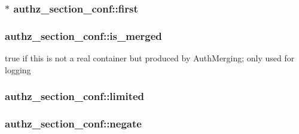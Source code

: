 \subsubsection[{\texorpdfstring{first}{first}}]{$\ast$ authz\+\_\+section\+\_\+conf\+::first}\hypertarget{structauthz__section__conf_a7587ce2d84cd06d2f62544a7b8c0d008}{}\label{structauthz__section__conf_a7587ce2d84cd06d2f62544a7b8c0d008}
\subsubsection[{\texorpdfstring{is\+\_\+merged}{is_merged}}]{ authz\+\_\+section\+\_\+conf\+::is\+\_\+merged}\hypertarget{structauthz__section__conf_ab7cc9377f7b3846ad4f6aa130c15190e}{}\label{structauthz__section__conf_ab7cc9377f7b3846ad4f6aa130c15190e}
true if this is not a real container but produced by Auth\+Merging; only used for logging 
\subsubsection[{\texorpdfstring{limited}{limited}}]{ authz\+\_\+section\+\_\+conf\+::limited}\hypertarget{structauthz__section__conf_afc4e78e9cc2c857edfd5a664c99acf22}{}\label{structauthz__section__conf_afc4e78e9cc2c857edfd5a664c99acf22}
\subsubsection[{\texorpdfstring{negate}{negate}}]{ authz\+\_\+section\+\_\+conf\+::negate}\hypertarget{structauthz__section__conf_adc246f9ab6a1d757d8011c1aa0d302d4}{}\label{structauthz__section__conf_adc246f9ab6a1d757d8011c1aa0d302d4}
